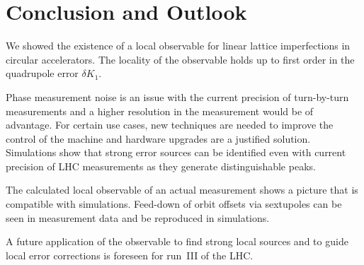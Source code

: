 \section{Conclusion and Outlook}

We showed the existence of a local observable for linear lattice imperfections in circular
accelerators. The locality of the observable holds up to first order in the quadrupole error
$\delta K_1$. 

Phase measurement noise is an issue with the current precision of turn-by-turn measurements and a
higher resolution in the measurement would be of advantage. For certain use cases, new techniques are
needed to improve the control of the machine and hardware upgrades are a justified solution.
Simulations show that strong error sources can be identified even with current precision of LHC measurements
as they generate distinguishable peaks.

The calculated local observable of an actual measurement shows a picture that is compatible with simulations.
Feed-down of orbit offsets via sextupoles can be seen in measurement data and be reproduced in simulations.

A future application of the observable to find strong local sources and to guide local error corrections
is foreseen for run~III of the LHC.
